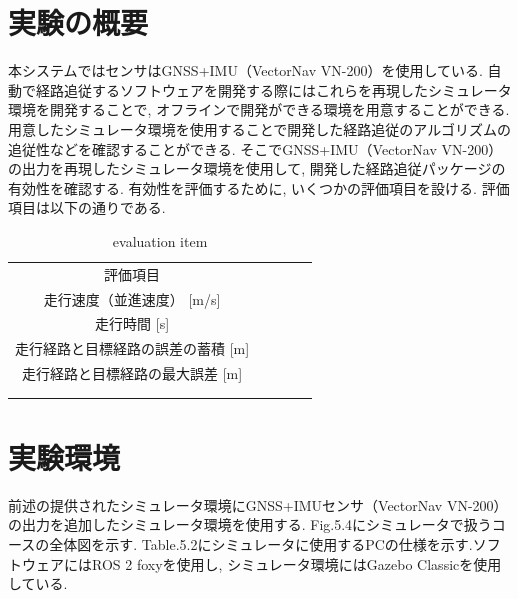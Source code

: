 \section{実験の概要}
本システムではセンサはGNSS+IMU（VectorNav VN-200）を使用している.
自動で経路追従するソフトウェアを開発する際にはこれらを再現したシミュレータ環境を開発することで, オフラインで開発ができる環境を用意することができる.
用意したシミュレータ環境を使用することで開発した経路追従のアルゴリズムの追従性などを確認することができる.
そこでGNSS+IMU（VectorNav VN-200）の出力を再現したシミュレータ環境を使用して, 開発した経路追従パッケージの有効性を確認する.
有効性を評価するために, いくつかの評価項目を設ける.
評価項目は以下の通りである.

\begin{table}[H]
  \centering
  \caption{evaluation item}
  \begin{tabular}{cclll}
  \cline{1-1}
  評価項目                    &  &  &  &  \\
  \cline{1-2}
  走行速度（並進速度） {[}m/s{]}    &  &  &  &  \\
  走行時間 {[}s{]}            &  &  &  &  \\
  走行経路と目標経路の誤差の蓄積 {[}m{]} &  &  &  &  \\
  走行経路と目標経路の最大誤差 {[}m{]}  &  &  &  &  \\
  \multicolumn{1}{l}{}    &  &  &  &  \\
  \multicolumn{1}{l}{}    &  &  &  & 
  \end{tabular}
\end{table}

\section{実験環境}
前述の提供されたシミュレータ環境にGNSS+IMUセンサ（VectorNav VN-200）の出力を追加したシミュレータ環境を使用する.
Fig.5.4にシミュレータで扱うコースの全体図を示す.
Table.5.2にシミュレータに使用するPCの仕様を示す.ソフトウェアにはROS 2 foxyを使用し, シミュレータ環境にはGazebo Classicを使用している.

